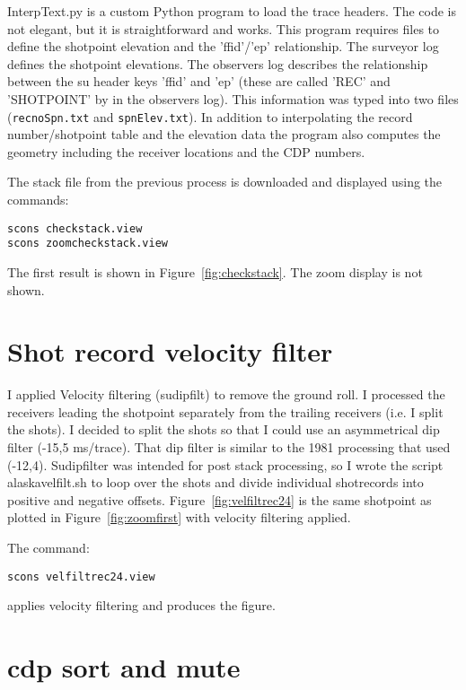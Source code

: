 InterpText.py is a custom Python program to load the trace headers.  The
code is not elegant, but it is straightforward and works.  This program 
requires files to define the shotpoint elevation and the 'ffid'/'ep' 
relationship.  The surveyor log defines the shotpoint elevations.  The 
observers log describes the relationship between the su header keys 
'ffid' and 'ep' (these are called 'REC' and 'SHOTPOINT' by in the observers 
log).  This information was typed into two files (\texttt{recnoSpn.txt} and 
\texttt{spnElev.txt}).  In addition to interpolating the record number/shotpoint 
table and the elevation data the program also computes the geometry 
including the receiver locations and the CDP numbers.

The stack file from the previous process is downloaded and displayed 
using the commands: 
\begin{verbatim}
scons checkstack.view 
scons zoomcheckstack.view
\end{verbatim}

The first result is shown in Figure~\ref{fig:checkstack}.  The zoom display
is not shown.


\section{Shot record velocity filter}
I applied Velocity filtering (sudipfilt) to remove the ground roll.  I
processed the receivers leading the shotpoint separately from the
trailing receivers (i.e. I split the shots).  I decided to split the
shots so that I could use an asymmetrical dip filter (-15,5 ms/trace).
That dip filter is similar to the 1981 processing that used
(-12,4). Sudipfilter was intended for post stack processing, so I
wrote the script alaskavelfilt.sh to loop over the shots and divide
individual shotrecords into positive and negative offsets.
Figure~\ref{fig:velfiltrec24} is the same shotpoint as plotted in
Figure~\ref{fig:zoomfirst} with velocity filtering applied.

The command:
\begin{verbatim}
scons velfiltrec24.view 
\end{verbatim}
applies velocity filtering and produces the figure.


\section{cdp sort and mute}

